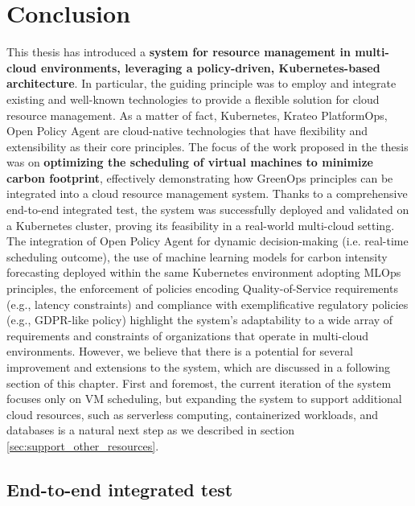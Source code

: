 \chapter{Conclusion}
\label{cha:conclusion}

This thesis has introduced a \textbf{system for resource management in multi-cloud environments, leveraging a policy-driven, Kubernetes-based architecture}. 
In particular, the guiding principle was to employ and integrate existing and well-known technologies to provide a flexible solution for cloud resource management.
As a matter of fact, Kubernetes, Krateo PlatformOps, Open Policy Agent are cloud-native technologies that have flexibility and extensibility as their core principles.
The focus of the work proposed in the thesis was on \textbf{optimizing the scheduling of virtual machines to minimize carbon footprint}, effectively demonstrating how GreenOps principles can be integrated into a cloud resource management system.
Thanks to a comprehensive end-to-end integrated test, the system was successfully deployed and validated on a Kubernetes cluster, proving its feasibility in a real-world multi-cloud setting.
The integration of Open Policy Agent for dynamic decision-making (i.e. real-time scheduling outcome), the use of machine learning models for carbon intensity forecasting deployed within the same Kubernetes environment adopting MLOps principles, the enforcement of policies encoding Quality-of-Service requirements (e.g., latency constraints) and compliance with exemplificative regulatory policies (e.g., GDPR-like policy) highlight the system’s adaptability to a wide array of requirements and constraints of organizations that operate in multi-cloud environments.
However, we believe that there is a potential for several improvement and extensions to the system, which are discussed in a following section of this chapter.
First and foremost, the current iteration of the system focuses only on VM scheduling, but expanding the system to support additional cloud resources, such as serverless computing, containerized workloads, and databases is a natural next step as we described in section \ref{sec:support_other_resources}.

\section{End-to-end integrated test}

